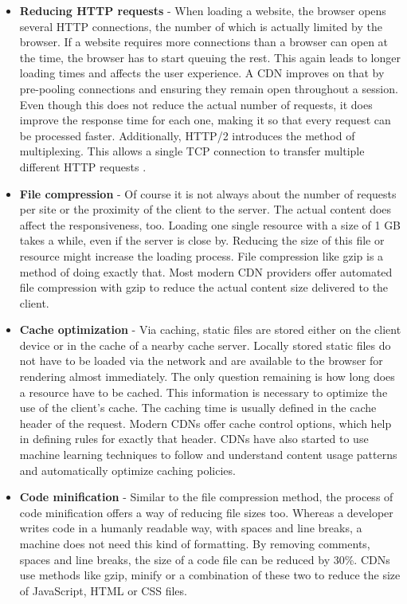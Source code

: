 \begin{itemize}
	\item \textbf{Reducing HTTP requests} - When loading a website, the browser opens several HTTP connections, the number of which is actually limited by the browser. If a website requires more connections than a browser can open at the time, the browser has to start queuing the rest. This again leads to longer loading times and affects the user experience. A CDN improves on that by pre-pooling connections and ensuring they remain open throughout a session. Even though this does not reduce the actual number of requests, it does improve the response time for each one, making it so that every request can be processed faster. Additionally, HTTP/2 introduces the method of multiplexing. This allows a single TCP connection to transfer multiple different HTTP requests \cite{http2}.
	
	\item \textbf{File compression} - Of course it is not always about the number of requests per site or the proximity of the client to the server. The actual content does affect the responsiveness, too. Loading one single resource with a size of 1 GB takes a while, even if the server is close by. Reducing the size of this file or resource might increase the loading process. File compression like gzip is a method of doing exactly that. Most modern CDN providers offer automated file compression with gzip to reduce the actual content size delivered to the client.
	
	\item \textbf{Cache optimization} - Via caching, static files are stored either on the client device or in the cache of a nearby cache server. Locally stored static files do not have to be loaded via the network and are available to the browser for rendering almost immediately. The only question remaining is how long does a resource have to be cached. This information is necessary to optimize the use of the client's cache. The caching time is usually defined in the cache header of the request. Modern CDNs offer cache control options, which help in defining rules for exactly that header.
	CDNs have also started to use machine learning techniques to follow and understand content usage patterns and automatically optimize caching policies.
	 
	\item \textbf{Code minification} - Similar to the file compression method, the process of code minification offers a way of reducing file sizes too. Whereas a developer writes code in a humanly readable way, with spaces and line breaks, a machine does not need this kind of formatting. By removing comments, spaces and line breaks, the size of a code file can be reduced by 30\%. CDNs use methods like gzip, minify or a combination of these two to reduce the size of JavaScript, HTML or CSS files.
	

\end{itemize}
